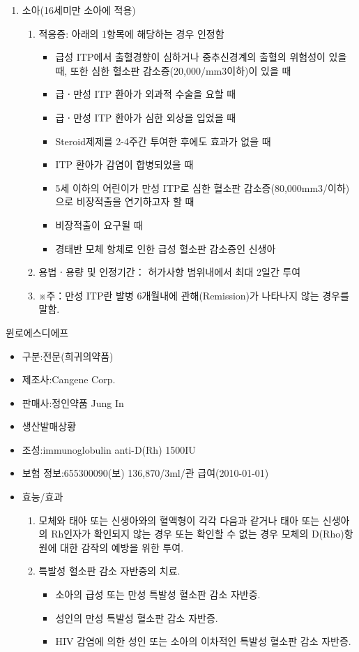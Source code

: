 {\begin{enumerate}[가.]
\begin{enumerate}[(가)]
  	\end{enumerate}
\item 소아(16세미만 소아에 적용) 
	\begin{enumerate}[(가)]\tightlist
	\item 적응증: 아래의 1항목에 해당하는 경우 인정함 
		\begin{itemize}\tightlist
		\item 급성 ITP에서 출혈경향이 심하거나 중추신경계의 출혈의 위험성이 있을 때, 또한 심한 혈소판 감소증(20,000/mm3이하)이 있을 때 
		\item 급ㆍ만성 ITP 환아가 외과적 수술을 요할 때 
		\item 급ㆍ만성 ITP 환아가 심한 외상을 입었을 때 
		\item Steroid제제를 2-4주간 투여한 후에도 효과가 없을 때 
		\item ITP 환아가 감염이 합병되었을 때 
		\item 5세 이하의 어린이가 만성 ITP로 심한 혈소판 감소증(80,000mm3/이하)으로 비장적출을 연기하고자 할 때 
		\item 비장적출이 요구될 때 
		\item 경태반 모체 항체로 인한 급성 혈소판 감소증인 신생아 
		\end{itemize}
	\item 용법ㆍ용량 및 인정기간： 허가사항 범위내에서 최대 2일간 투여 
	\item ※주：만성 ITP란 발병 6개월내에 관해(Remission)가 나타나지 않는 경우를 말함.
	\end{enumerate}
\end{enumerate}
}
\begin{commentbox}{윈로에스디에프}
\begin{itemize}\tightlist
\item 구분:전문(희귀의약품)
\item 제조사:Cangene Corp.	
\item 판매사:정인약품 Jung In	
\item 생산발매상황
\item 조성:immunoglobulin anti-D(Rh) 1500IU 
\item 보험 정보:655300090(보) 136,870/3ml/관 급여(2010-01-01)
\item 효능/효과
	\begin{enumerate}\tightlist
	\item 모체와 태아 또는 신생아와의 혈액형이 각각 다음과 같거나 태아 또는 신생아의 Rh인자가 확인되지 않는 경우 또는 확인할 수 없는 경우 모체의 D(Rho)항원에 대한 감작의 예방을 위한 투여. 
	\item 특발성 혈소판 감소 자반증의 치료. 
		\begin{itemize}\tightlist
		\item 소아의 급성 또는 만성 특발성 혈소판 감소 자반증. 
		\item 성인의 만성 특발성 혈소판 감소 자반증. 
		\item HIV 감염에 의한 성인 또는 소아의 이차적인 특발성 혈소판 감소 자반증.
		\end{itemize}
	\end{enumerate}
\end{itemize}
\end{commentbox}